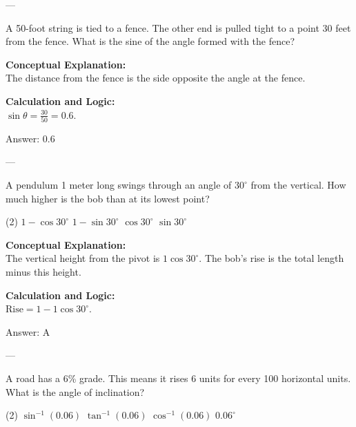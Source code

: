 \documentclass[11pt,paper=a4,answers]{exam}
\begin{document}
\begin{questions}
---

\question
A 50-foot string is tied to a fence. The other end is pulled tight to a point 30 feet from the fence. What is the sine of the angle formed with the fence?

\begin{solution}
\textbf{Conceptual Explanation:} \\
The distance from the fence is the side opposite the angle at the fence.

\vspace{10pt}
\textbf{Calculation and Logic:} \\
$\sin \theta = \frac{30}{50} = 0.6$.

\vspace{15pt}
Answer: \colorbox{yellow!100}{0.6}
\end{solution}

---

\question
A pendulum 1 meter long swings through an angle of $30^\circ$ from the vertical. How much higher is the bob than at its lowest point?
\begin{tasks}(2)
    \task $1 - \cos 30^\circ$
    \task $1 - \sin 30^\circ$
    \task $\cos 30^\circ$
    \task $\sin 30^\circ$
\end{tasks}

\begin{solution}
\textbf{Conceptual Explanation:} \\
The vertical height from the pivot is $1 \cos 30^\circ$. The bob's rise is the total length minus this height.

\vspace{10pt}
\textbf{Calculation and Logic:} \\
$\text{Rise} = 1 - 1 \cos 30^\circ$.

\vspace{15pt}
Answer: \colorbox{yellow!100}{A}
\end{solution}

---

\question
A road has a 6\% grade. This means it rises 6 units for every 100 horizontal units. What is the angle of inclination?
\begin{tasks}(2)
    \task $\sin^{-1}(0.06)$
    \task $\tan^{-1}(0.06)$
    \task $\cos^{-1}(0.06)$
    \task $0.06^\circ$
\end{tasks}


\end{questions}
\end{document}
